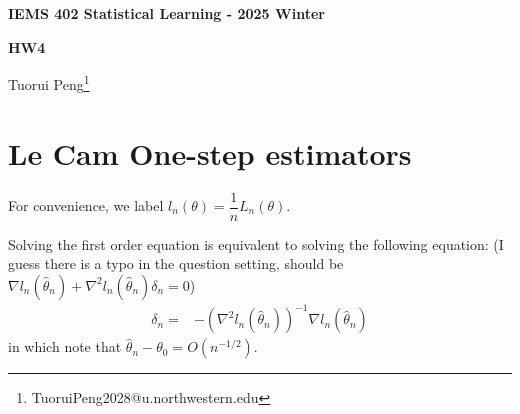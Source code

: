 \documentclass[11pt,a4paper]{ctexart}
\numberwithin{equation}{section}%
\begin{document}
\begin{center}\thispagestyle{plain}

{\LARGE\textbf{IEMS 402 Statistical Learning - 2025 Winter}}

{\Large\textbf{HW4}}

Tuorui Peng\footnote{TuoruiPeng2028@u.northwestern.edu}
\end{center}

\thispagestyle{myheadings}
\pagestyle{myheadings}




\section{Le Cam One-step estimators}

For convenience, we label $ l_n(\theta ) = \dfrac{ 1 }{ n }L_n(\theta)  $.


Solving the first order equation is equivalent to solving the following equation: (I guess there is a typo in the question setting, should be $ \nabla l_n(\hat{\theta } _n) + \nabla^2 l_n(\hat{\theta } _n)\delta _n = 0 $)
\begin{align*}
    \delta _n  =& - (\nabla^2 l_n(\hat{\theta } _n))^{-1} \nabla l_n(\hat{\theta } _n) 
\end{align*}
in which note that $ \hat{\theta }_n - \theta _0 = O(n^{-1/2}) $.
\end{document}
